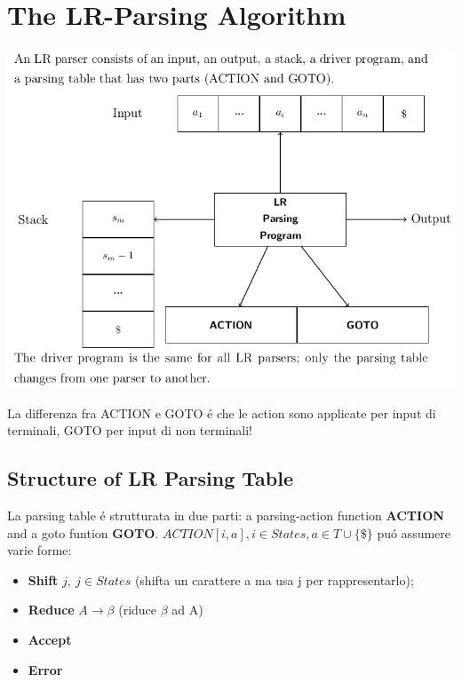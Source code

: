 \section{The LR-Parsing Algorithm}
\begin{center}
    \includegraphics[scale=0.6]{Chapters/Img/c04_08.png}\\
\end{center}

\begin{tcolorbox}\begin{center}
    La differenza fra ACTION e GOTO \'e che le action sono applicate per input di terminali, GOTO per input di non terminali!
\end{center}\end{tcolorbox}

\subsection{Structure of LR Parsing Table}
La parsing table \'e strutturata in due parti: a parsing-action function \textbf{ACTION} and a goto funtion \textbf{GOTO}.
$ACTION[i,a], i \in States, a \in T \cup \{\$\}$ pu\'o assumere varie forme:

\begin{itemize}
    \item \textbf{Shift} $j,\ j \in States$ (shifta un carattere a ma usa j per rappresentarlo);\\
    \item \textbf{Reduce} $A \rightarrow \beta$ (riduce $\beta$ ad A)\\
    \item \textbf{Accept} \\
    \item \textbf{Error}\\
\end{itemize}

